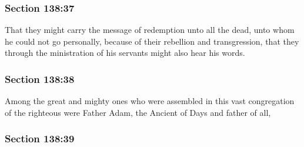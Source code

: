 
	\subsubsection{Section 138:37} %
		\label{DC138-37}

		That they might carry the message of redemption unto all the dead, unto whom he could not go personally, because of their rebellion and transgression, that they through the ministration of his servants might also hear his words.


	\subsubsection{Section 138:38} %
		\label{DC138-38}

		Among the great and mighty ones who were assembled in this vast congregation of the righteous were Father Adam, the Ancient of Days and father of all,


	\subsubsection{Section 138:39} %
		\label{DC138-39}

